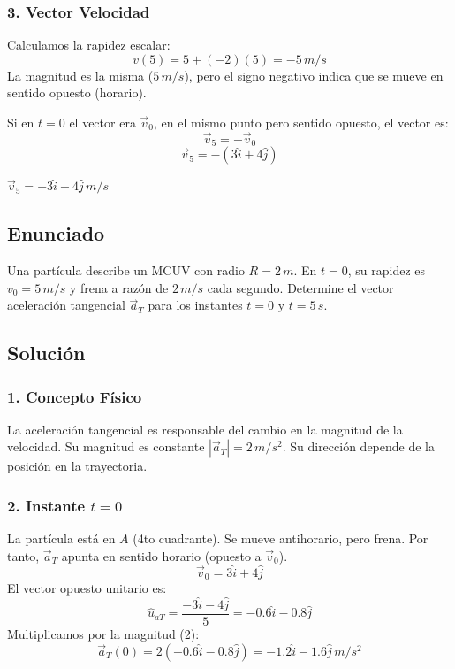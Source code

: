 \documentclass[12pt, a4paper]{article}
\begin{document}
\subsubsection*{3. Vector Velocidad}
Calculamos la rapidez escalar:
$$ v(5) = 5 + (-2)(5) = -5 \, \si{m/s} $$
La magnitud es la misma ($5\,\si{m/s}$), pero el signo negativo indica que se mueve en sentido opuesto (horario).

Si en $t=0$ el vector era $\vec{v}_0$, en el mismo punto pero sentido opuesto, el vector es:
$$ \vec{v}_5 = -\vec{v}_0 $$
$$ \vec{v}_5 = -(3\hat{i} + 4\hat{j}) $$

\begin{tcolorbox}[colback=green!5!white, colframe=green!50!black, title=Respuesta Final]
\centering $\vec{v}_5 = -3\hat{i} - 4\hat{j} \, \si{m/s}$
\end{tcolorbox}

\newpage

\subsection*{Enunciado}
Una partícula describe un MCUV con radio $R=2\,\si{m}$. En $t=0$, su rapidez es $v_0 = 5\,\si{m/s}$ y frena a razón de $2\,\si{m/s}$ cada segundo. Determine el vector aceleración tangencial $\vec{a}_T$ para los instantes $t=0$ y $t=5\,\si{s}$.

\subsection*{Solución}

\subsubsection*{1. Concepto Físico}
La aceleración tangencial es responsable del cambio en la magnitud de la velocidad. Su magnitud es constante $|\vec{a}_T| = 2\,\si{m/s^2}$.
Su dirección depende de la posición en la trayectoria.

\subsubsection*{2. Instante $t=0$}
La partícula está en $A$ (4to cuadrante). Se mueve antihorario, pero frena. Por tanto, $\vec{a}_T$ apunta en sentido horario (opuesto a $\vec{v}_0$).
$$ \vec{v}_0 = 3\hat{i} + 4\hat{j} $$
El vector opuesto unitario es:
$$ \hat{u}_{aT} = \frac{-3\hat{i} - 4\hat{j}}{5} = -0.6\hat{i} - 0.8\hat{j} $$
Multiplicamos por la magnitud (2):
$$ \vec{a}_T(0) = 2(-0.6\hat{i} - 0.8\hat{j}) = -1.2\hat{i} - 1.6\hat{j} \, \si{m/s^2} $$
\end{document}
